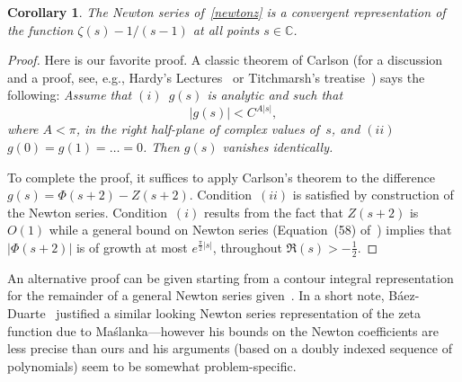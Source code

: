 \documentclass{amsart}
\def\C{\mathbb{C}}
\def\ds{\displaystyle}
\newtheorem{corollary}{Corollary}
\begin{document}
\begin{corollary}\label{newton-cor} The Newton series of~\eqref{newtonz} 
is a convergent representation of the function $\zeta(s)-1/(s-1)$
at all points $s\in\C$.
\end{corollary}
\begin{proof} 
Here  is our favorite  proof.  A   classic theorem  of Carlson  (for a
discussion        and      a     proof,     see,      e.g.,    Hardy's
Lectures~\cite[pp.~188-191]{Hardy78}          or          Titchmarsh's
treatise~\cite[\S5.81]{Titchmarsh39})  says the following:
\emph{Assume that $(i)$~$g(s)$ is
analytic and such that
\[
\left|g(s)\right|<C^{A|s|},
\]
where $A<\pi$, in the right half-plane of complex values of~$s$,
and $(ii)$~$g(0)=g(1)=\ldots=0$. Then $g(s)$ vanishes identically.}


To complete the proof, it  suffices to apply  Carlson's theorem to the
difference    $g(s)=\Phi(s+2)-Z(s+2)$.
Condition~$(ii)$ is    satisfied  by   construction  of    the  Newton
series. Condition~$(i)$ results from  the fact that $Z(s+2)$ is $O(1)$
while  a general bound  on Newton series
(Equation~(58) of~\cite[p.~228]{Norlund54})
implies
that $|\Phi(s+2)|$  is of 
growth at most $e^{\frac{\pi}{2}|s|}$, throughout $\Re(s)>-\frac12$.
% 
% 
% 
\end{proof}

An alternative proof can be given starting from a contour integral representation for the remainder of 
a general Newton series given~\cite[p.~223]{Norlund54}. In a short note, B\'aez-Duarte~\cite{Baez03}
justified a similar looking Newton series representation of the zeta function due to Ma\'slanka---however
his bounds on the Newton coefficients are less precise than ours and his arguments (based on
a doubly indexed sequence of polynomials) seem to be somewhat problem-specific.
\end{document}
